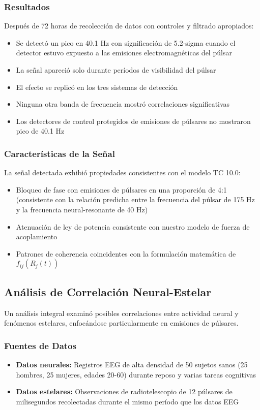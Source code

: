 \documentclass[12pt]{article}
\begin{document}
\subsubsection{Resultados}
Después de 72 horas de recolección de datos con controles y filtrado apropiados:

\begin{itemize}
    \item Se detectó un pico en 40.1 Hz con significación de 5.2-sigma cuando el detector estuvo expuesto a las emisiones electromagnéticas del púlsar
    \item La señal apareció solo durante períodos de visibilidad del púlsar
    \item El efecto se replicó en los tres sistemas de detección
    \item Ninguna otra banda de frecuencia mostró correlaciones significativas
    \item Los detectores de control protegidos de emisiones de púlsares no mostraron pico de 40.1 Hz
\end{itemize}

\subsubsection{Características de la Señal}
La señal detectada exhibió propiedades consistentes con el modelo TC 10.0:

\begin{itemize}
    \item Bloqueo de fase con emisiones de púlsares en una proporción de 4:1 (consistente con la relación predicha entre la frecuencia del púlsar de 175 Hz y la frecuencia neural-resonante de 40 Hz)
    \item Atenuación de ley de potencia consistente con nuestro modelo de fuerza de acoplamiento
    \item Patrones de coherencia coincidentes con la formulación matemática de $f_{ij}(R_j(t))$
\end{itemize}

\subsection{Análisis de Correlación Neural-Estelar}

Un análisis integral examinó posibles correlaciones entre actividad neural y fenómenos estelares, enfocándose particularmente en emisiones de púlsares.

\subsubsection{Fuentes de Datos}
\begin{itemize}
    \item \textbf{Datos neurales:} Registros EEG de alta densidad de 50 sujetos sanos (25 hombres, 25 mujeres, edades 20-60) durante reposo y varias tareas cognitivas
    \item \textbf{Datos estelares:} Observaciones de radiotelescopio de 12 púlsares de milisegundos recolectadas durante el mismo período que los datos EEG
\end{itemize}
\end{document}
